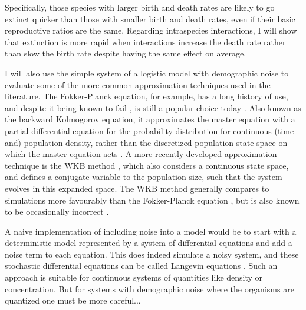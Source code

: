 Specifically, those species with larger birth and death rates are likely to go extinct quicker than those with smaller birth and death rates, even if their basic reproductive ratios are the same. 
Regarding intraspecies interactions, I will show that extinction is more rapid when interactions increase the death rate rather than slow the birth rate despite having the same effect on average. 

I will also use the simple system of a logistic model with demographic noise to evaluate some of the more common approximation techniques used in the literature. 
The Fokker-Planck equation, for example, has a long history of use, and despite it being known to fail \cite{Grasman1983,Doering2005}, is still a popular choice today \cite{Kimura1955,Mangel1977,Roozen1987,Leigh1981,Lande1993,Foley1994,Traulsen2006,Parsons2007,Parsons2010,Chotibut2015,Constable2015,Lin2015,Iyer-Biswas2015,Yu2017,Young2018}. 
Also known as the backward Kolmogorov equation, it approximates the master equation with a partial differential equation for the probability distribution for continuous (time and) population density, rather than the discretized population state space on which the master equation acts \cite{Nisbet1982,Gardiner2004}. 
A more recently developed approximation technique is the WKB method \cite{Doering2005,Assaf2006,Kessler2007,Ovaskainen2010,Assaf2016}, which also considers a continuous state space, and defines a conjugate variable to the population size, such that the system evolves in this expanded space. 
The WKB method generally compares to simulations more favourably than the Fokker-Planck equation \cite{Yu2017}, but is also known to be occasionally incorrect \cite{Assaf2010}. %

\iffalse
A naive implementation of including noise into a model would be to start with a deterministic model represented by a system of differential equations and add a noise term to each equation. 
This does indeed simulate a noisy system, and these stochastic differential equations can be called Langevin equations \cite{Nisbet1982,Gardiner2004}. 
Such an approach is suitable for continuous systems of quantities like density or concentration. 
But for systems with demographic noise where the organisms are quantized one must be more careful...

